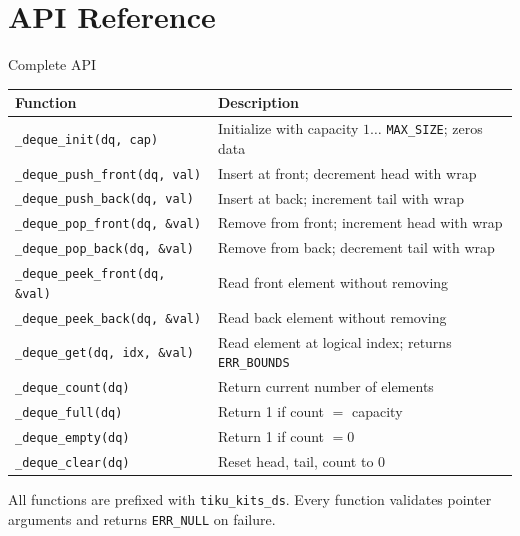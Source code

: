 \documentclass[aspectratio=169, 10pt]{beamer}
\begin{document}
\section{API Reference}

\begin{frame}[fragile]{Complete API}
\begin{table}
\centering
\small
\begin{tabular}{@{}lp{8cm}@{}}
\toprule
\textbf{Function} & \textbf{Description} \\
\midrule
\texttt{\_deque\_init(dq, cap)}
  & Initialize with capacity $1 \ldots$ \texttt{MAX\_SIZE}; zeros data \\
\texttt{\_deque\_push\_front(dq, val)}
  & Insert at front; decrement head with wrap \\
\texttt{\_deque\_push\_back(dq, val)}
  & Insert at back; increment tail with wrap \\
\texttt{\_deque\_pop\_front(dq, \&val)}
  & Remove from front; increment head with wrap \\
\texttt{\_deque\_pop\_back(dq, \&val)}
  & Remove from back; decrement tail with wrap \\
\texttt{\_deque\_peek\_front(dq, \&val)}
  & Read front element without removing \\
\texttt{\_deque\_peek\_back(dq, \&val)}
  & Read back element without removing \\
\midrule
\texttt{\_deque\_get(dq, idx, \&val)}
  & Read element at logical index; returns \texttt{ERR\_BOUNDS} \\
\texttt{\_deque\_count(dq)}
  & Return current number of elements \\
\texttt{\_deque\_full(dq)}
  & Return 1 if count $=$ capacity \\
\texttt{\_deque\_empty(dq)}
  & Return 1 if count $= 0$ \\
\texttt{\_deque\_clear(dq)}
  & Reset head, tail, count to 0 \\
\bottomrule
\end{tabular}
\end{table}

\vspace{0.3em}
{\scriptsize All functions are prefixed with \texttt{tiku\_kits\_ds}.
Every function validates pointer arguments and returns \texttt{ERR\_NULL} on failure.}
\end{frame}

\end{document}
